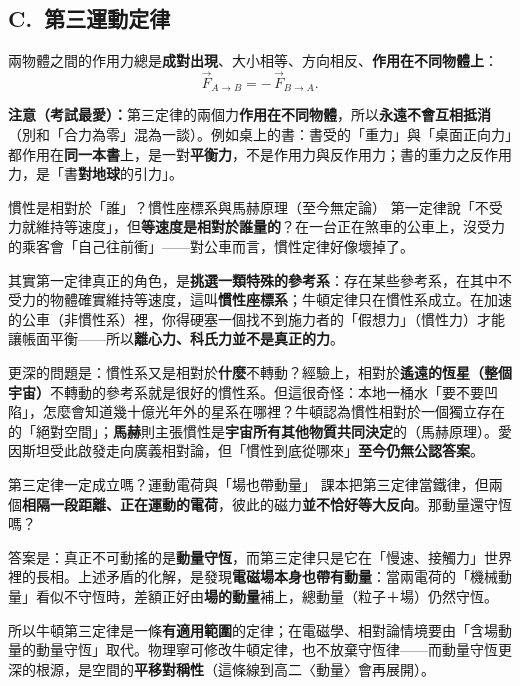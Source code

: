 \documentclass[11pt]{article}
\begin{document}
\subsection*{\sffamily C.\ 第三運動定律}

兩物體之間的作用力總是\textbf{成對出現}、大小相等、方向相反、\textbf{作用在不同物體上}：
$$\vec{F}_{A\to B} = -\,\vec{F}_{B\to A}.$$

\textbf{注意（考試最愛）：}第三定律的兩個力\textbf{作用在不同物體}，所以\textbf{永遠不會互相抵消}（別和「合力為零」混為一談）。例如桌上的書：書受的「重力」與「桌面正向力」都作用在\textbf{同一本書}上，是一對\textbf{平衡力}，不是作用力與反作用力；書的重力之反作用力，是「書\textbf{對地球}的引力」。

\begin{延伸框}{慣性是相對於「誰」？慣性座標系與馬赫原理（至今無定論）}
第一定律說「不受力就維持等速度」，但\textbf{等速度是相對於誰量的}？在一台正在煞車的公車上，沒受力的乘客會「自己往前衝」——對公車而言，慣性定律好像壞掉了。

其實第一定律真正的角色，是\textbf{挑選一類特殊的參考系}：存在某些參考系，在其中不受力的物體確實維持等速度，這叫\textbf{慣性座標系}；牛頓定律只在慣性系成立。在加速的公車（非慣性系）裡，你得硬塞一個找不到施力者的「假想力」（慣性力）才能讓帳面平衡——所以\textbf{離心力、科氏力並不是真正的力}。

更深的問題是：慣性系又是相對於\textbf{什麼}不轉動？經驗上，相對於\textbf{遙遠的恆星（整個宇宙）}不轉動的參考系就是很好的慣性系。但這很奇怪：本地一桶水「要不要凹陷」，怎麼會知道幾十億光年外的星系在哪裡？牛頓認為慣性相對於一個獨立存在的「絕對空間」；\textbf{馬赫}則主張慣性是\textbf{宇宙所有其他物質共同決定}的（馬赫原理）。愛因斯坦受此啟發走向廣義相對論，但「慣性到底從哪來」\textbf{至今仍無公認答案}。
\end{延伸框}

\begin{延伸框}{第三定律一定成立嗎？運動電荷與「場也帶動量」}
課本把第三定律當鐵律，但兩個\textbf{相隔一段距離、正在運動的電荷}，彼此的磁力\textbf{並不恰好等大反向}。那動量還守恆嗎？

答案是：真正不可動搖的是\textbf{動量守恆}，而第三定律只是它在「慢速、接觸力」世界裡的長相。上述矛盾的化解，是發現\textbf{電磁場本身也帶有動量}：當兩電荷的「機械動量」看似不守恆時，差額正好由\textbf{場的動量}補上，總動量（粒子＋場）仍然守恆。

所以牛頓第三定律是一條\textbf{有適用範圍}的定律；在電磁學、相對論情境要由「含場動量的動量守恆」取代。物理寧可修改牛頓定律，也不放棄守恆律——而動量守恆更深的根源，是空間的\textbf{平移對稱性}（這條線到高二〈動量〉會再展開）。
\end{延伸框}
\end{document}
